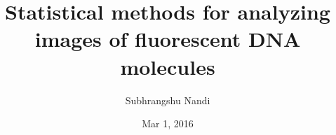 \documentclass[12pt]{article}
\begin{document}
\title{Statistical methods for analyzing images of fluorescent DNA molecules}
\author{Subhrangshu Nandi}
\date{Mar 1, 2016}

\maketitle



\newpage



\end{document}
